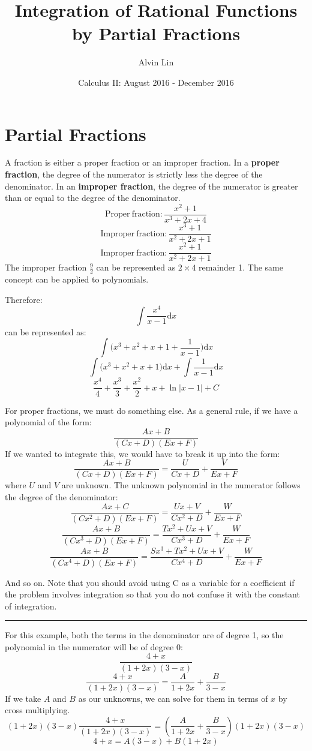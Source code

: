 \documentclass[letterpaper, 12pt]{article}
\title{Integration of Rational Functions by Partial Fractions}
\author{Alvin Lin}
\date{Calculus II: August 2016 - December 2016}
\newcommand*{\diff}{\mathrm{d}}
\begin{document}
\maketitle

\section*{Partial Fractions}
A fraction is either a proper fraction or an improper fraction. In a
\textbf{proper fraction}, the degree of the numerator is strictly less the
degree of the denominator. In an \textbf{improper fraction}, the degree of
the numerator is greater than or equal to the degree of the denominator.
\[ \mathrm{Proper\ fraction}: \frac{x^{2}+1}{x^{3}+2x+4} \]
\[ \mathrm{Improper\ fraction}: \frac{x^{3}+1}{x^{2}+2x+1} \]
\[ \mathrm{Improper\ fraction}: \frac{x^{2}+1}{x^{2}+2x+1} \]
The improper fraction \( \frac{9}{2} \) can be represented as \( 2\times4 \)
remainder 1. The same concept can be applied to polynomials.
\begin{center}
\end{center}
Therefore:
\[ \int{\frac{x^{4}}{x-1}\diff{x}} \]
can be represented as:
\[ \int{\bigg(x^{3}+x^{2}+x+1+\frac{1}{x-1}\bigg)\diff{x}} \]
\[ \int{\bigg(x^{3}+x^{2}+x+1\bigg)\diff{x}}+\int{\frac{1}{x-1}\diff{x}} \]
\[ \frac{x^{4}}{4}+\frac{x^{3}}{3}+\frac{x^{2}}{2}+x+\ln|x-1|+C \]

For proper fractions, we must do something else. As a general rule, if we
have a polynomial of the form:
\[ \frac{Ax+B}{(Cx+D)(Ex+F)} \]
If we wanted to integrate this, we would have to break it up into the form:
\[ \frac{Ax+B}{(Cx+D)(Ex+F)} = \frac{U}{Cx+D}+\frac{V}{Ex+F} \]
where \( U \) and \( V \) are unknown. The unknown polynomial in the numerator
follows the degree of the denominator:
\[ \frac{Ax+C}{(Cx^{2}+D)(Ex+F)} = \frac{Ux+V}{Cx^{2}+D}+\frac{W}{Ex+F} \]
\[ \frac{Ax+B}{(Cx^{3}+D)(Ex+F)} =
   \frac{Tx^{2}+Ux+V}{Cx^{3}+D}+\frac{W}{Ex+F} \]
\[ \frac{Ax+B}{(Cx^{4}+D)(Ex+F)} =
   \frac{Sx^{3}+Tx^{2}+Ux+V}{Cx^{4}+D}+\frac{W}{Ex+F} \]
\begin{center}
  And so on. Note that you should avoid using C as a variable for a coefficient
  if the problem involves integration so that you do not confuse it with the
  constant of integration.
\end{center}

\noindent\rule{13.7cm}{0.4pt}

For this example, both the terms in the denominator are of degree 1, so
the polynomial in the numerator will be of degree 0:
\[ \frac{4+x}{(1+2x)(3-x)} \]
\[ \frac{4+x}{(1+2x)(3-x)} = \frac{A}{1+2x}+\frac{B}{3-x} \]
If we take \( A \) and \( B \) as our unknowns, we can solve for them in terms
of \( x \) by cross multiplying.
\[ (1+2x)(3-x)\frac{4+x}{(1+2x)(3-x)} =
   (\frac{A}{1+2x}+\frac{B}{3-x})(1+2x)(3-x) \]
\[ 4+x = A(3-x)+B(1+2x) \]
\end{document}
